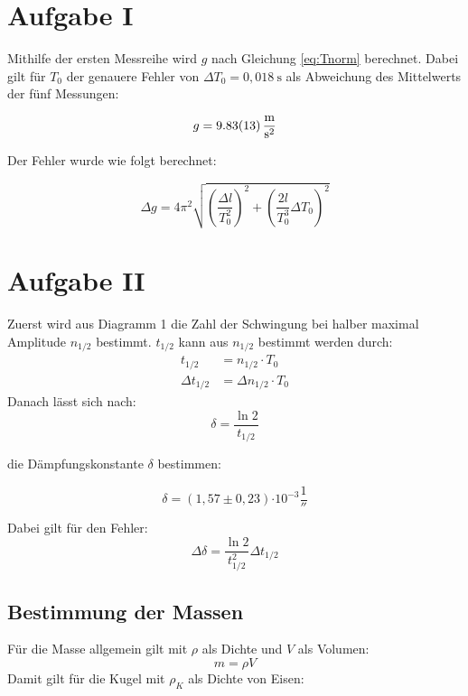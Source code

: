 \section{Aufgabe I}

Mithilfe der ersten Messreihe wird $g$ nach Gleichung \ref{eq:Tnorm} berechnet.
Dabei gilt für $T_0$ der genauere Fehler von $\Delta T_0 = 0,018\ \text{s}$ als Abweichung des Mittelwerts der fünf Messungen:

\[g =\SI{9,83 \pm 0,13 }{\frac{\meter}{\second^2}}\]

Der Fehler wurde wie folgt berechnet:

\begin{equation}
    \Delta g = 4\pi^2 \sqrt{\left(\frac{\Delta l}{T_0^2}\right)^2 + \left(\frac{2l}{T_0^3}\Delta T_0\right)^2}
\end{equation}

\section{Aufgabe II}

Zuerst wird aus Diagramm 1 die Zahl der Schwingung bei halber maximal Amplitude $n_{1/2}$ bestimmt. 
$t_{1/2}$ kann aus $n_{1/2}$ bestimmt werden durch:
\begin{align}
    t_{1/2} &= n_{1/2} \cdot T_0 \\
    \Delta t_{1/2} &= \Delta n_{1/2} \cdot T_0
\end{align}
Danach lässt sich nach:
\begin{equation}
    \delta = \frac{\ln 2}{t_{1/2}}
\end{equation}

die Dämpfungskonstante $\delta$ bestimmen:

\[ \delta = (1,57 \pm 0,23) \si{\cdot 10^{-3}\frac{1}{\second}}\]

Dabei gilt für den Fehler:
\begin{equation}
    \Delta \delta = \frac{\ln 2}{t_{1/2}^2}\Delta t_{1/2}
\end{equation}



\subsection{Bestimmung der Massen}

Für die Masse allgemein gilt mit $\rho$ als Dichte und $V$ als Volumen:
\begin{equation}
    m = \rho V
\end{equation}
Damit gilt für die Kugel mit $\rho_K$ als Dichte von Eisen:

